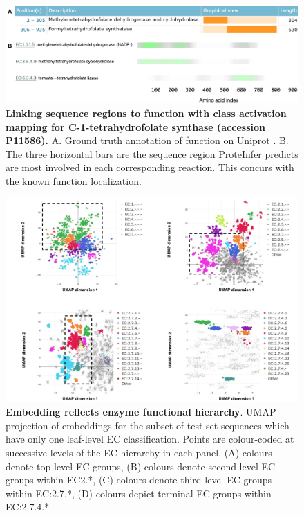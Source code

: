 \begin{figure}[t]
  \centering
    \includegraphics[width=\textwidth]{Figures/tetrahydrofolate_synthase.png}
    \caption{\textbf{Linking sequence regions to function with class activation mapping for C-1-tetrahydrofolate synthase (accession P11586).} A. Ground truth annotation of function on Uniprot \citep{uniprotlatest}. B. The three horizontal bars are the sequence region ProteInfer predicts are most involved in each corresponding reaction. This concurs with the known function localization. }
    \label{fig:cam}
  \end{figure}

  \begin{figure}
    \centering
      \includegraphics[width=\textwidth]{Figures/umap2.pdf}%
      \caption{\textbf{Embedding reflects enzyme functional hierarchy}. UMAP projection of embeddings for the subset of test set sequences which have only one leaf-level EC classification. Points are colour-coded at successive levels of the EC hierarchy in each panel. (A) colours denote top level EC groups, (B) colours denote second level EC groups within EC2.*, (C) colours denote third level EC groups within EC:2.7.*, (D) colours depict terminal EC groups within EC:2.7.4.* }
      \label{fig:umap}
    \end{figure}

